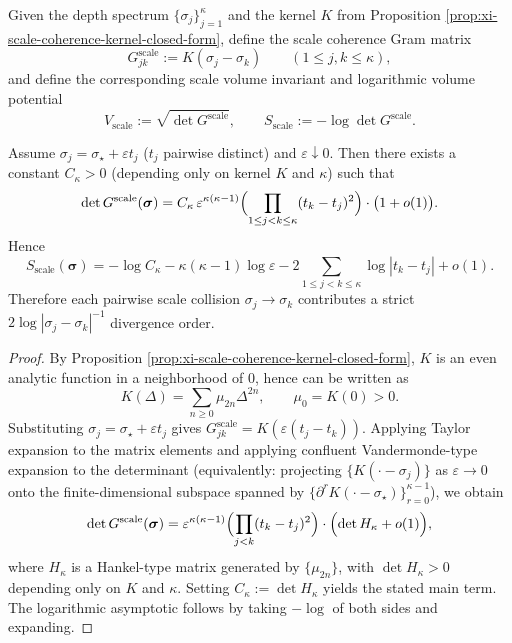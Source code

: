 \begin{definition}\label{def:xi-scale-coherence-gram-volume}
Given the depth spectrum \(\{\sigma_j\}_{j=1}^{\kappa}\) and the kernel \(K\) from Proposition \ref{prop:xi-scale-coherence-kernel-closed-form}, define the scale coherence Gram matrix
\[
G^{\mathrm{scale}}_{jk}:=K(\sigma_j-\sigma_k)\qquad(1\le j,k\le\kappa),
\]
and define the corresponding scale volume invariant and logarithmic volume potential
\[
V_{\mathrm{scale}}:=\sqrt{\det G^{\mathrm{scale}}},
\qquad
S_{\mathrm{scale}}:=-\log\det G^{\mathrm{scale}}.
\]
\end{definition}

\begin{proposition}\label{prop:xi-scale-coherence-collision-vandermonde}
Assume \(\sigma_j=\sigma_\star+\varepsilon t_j\) (\(t_j\) pairwise distinct) and \(\varepsilon\downarrow 0\).
Then there exists a constant \(C_\kappa>0\) (depending only on kernel \(K\) and \(\kappa\)) such that
\[
\det G^{\mathrm{scale}}(\boldsymbol{\sigma})
= C_\kappa\,\varepsilon^{\kappa(\kappa-1)}
\Bigl(\prod_{1\le j<k\le\kappa}(t_k-t_j)^2\Bigr)\cdot\bigl(1+o(1)\bigr).
\]
Hence
\[
S_{\mathrm{scale}}(\boldsymbol{\sigma})
= -\log C_\kappa-\kappa(\kappa-1)\log\varepsilon-2\sum_{1\le j<k\le\kappa}\log|t_k-t_j|+o(1).
\]
Therefore each pairwise scale collision \(\sigma_j\to\sigma_k\) contributes a strict \(2\log|\sigma_j-\sigma_k|^{-1}\) divergence order.
\end{proposition}
\begin{proof}
By Proposition \ref{prop:xi-scale-coherence-kernel-closed-form}, \(K\) is an even analytic function in a neighborhood of \(0\), hence can be written as
\[
K(\Delta)=\sum_{n\ge 0}\mu_{2n}\Delta^{2n},\qquad \mu_0=K(0)>0.
\]
Substituting \(\sigma_j=\sigma_\star+\varepsilon t_j\) gives
\(
G^{\mathrm{scale}}_{jk}=K(\varepsilon(t_j-t_k))
\).
Applying Taylor expansion to the matrix elements and applying confluent Vandermonde-type expansion to the determinant (equivalently: projecting \(\{K(\cdot-\sigma_j)\}\) as \(\varepsilon\to 0\) onto the finite-dimensional subspace spanned by \(\{\partial^r K(\cdot-\sigma_\star)\}_{r=0}^{\kappa-1}\)), we obtain
\[
\det G^{\mathrm{scale}}(\boldsymbol{\sigma})
=\varepsilon^{\kappa(\kappa-1)}\Bigl(\prod_{j<k}(t_k-t_j)^2\Bigr)\cdot\Bigl(\det H_\kappa+o(1)\Bigr),
\]
where \(H_\kappa\) is a Hankel-type matrix generated by \(\{\mu_{2n}\}\), with \(\det H_\kappa>0\) depending only on \(K\) and \(\kappa\).
Setting \(C_\kappa:=\det H_\kappa\) yields the stated main term.
The logarithmic asymptotic follows by taking \(-\log\) of both sides and expanding.
\end{proof}

